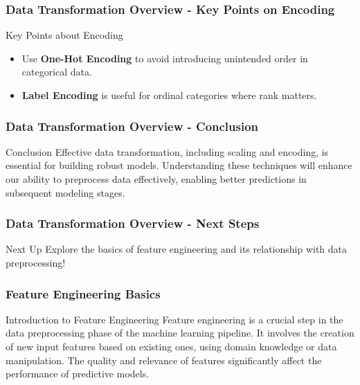 \documentclass[aspectratio=169]{beamer}
\begin{document}
\begin{frame}[fragile]
    \frametitle{Data Transformation Overview - Key Points on Encoding}
    \begin{block}{Key Points about Encoding}
        \begin{itemize}
            \item Use \textbf{One-Hot Encoding} to avoid introducing unintended order in categorical data.
            \item \textbf{Label Encoding} is useful for ordinal categories where rank matters.
        \end{itemize}
    \end{block}
\end{frame}

\begin{frame}[fragile]
    \frametitle{Data Transformation Overview - Conclusion}
    \begin{block}{Conclusion}
        Effective data transformation, including scaling and encoding, is essential for building robust models. Understanding these techniques will enhance our ability to preprocess data effectively, enabling better predictions in subsequent modeling stages.
    \end{block}
\end{frame}

\begin{frame}[fragile]
    \frametitle{Data Transformation Overview - Next Steps}
    \begin{block}{Next Up}
        Explore the basics of feature engineering and its relationship with data preprocessing!
    \end{block}
\end{frame}

\begin{frame}[fragile]
    \frametitle{Feature Engineering Basics}
    \begin{block}{Introduction to Feature Engineering}
        Feature engineering is a crucial step in the data preprocessing phase of the machine learning pipeline. It involves the creation of new input features based on existing ones, using domain knowledge or data manipulation. The quality and relevance of features significantly affect the performance of predictive models.
    \end{block}
\end{frame}
\end{document}
